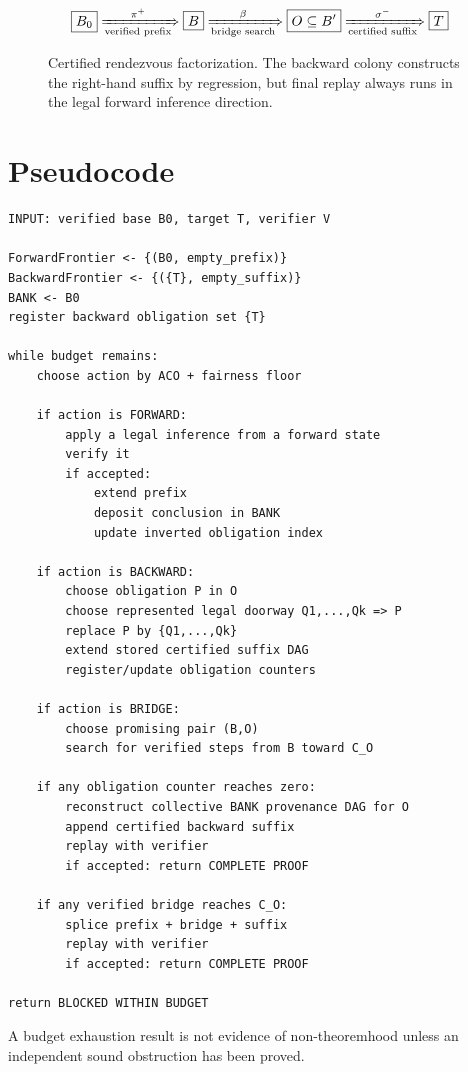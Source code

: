 \documentclass[11pt]{article}
\begin{document}
\begin{figure}[h]
\centering
\[
\boxed{B_0}
\xRightarrow[\text{verified prefix}]{\pi^+}
\boxed{B}
\xRightarrow[\text{bridge search}]{\beta}
\boxed{O\subseteq B'}
\xRightarrow[\text{certified suffix}]{\sigma^-}
\boxed{T}
\]
\caption{Certified rendezvous factorization. The backward colony constructs the right-hand suffix by regression, but final replay always runs in the legal forward inference direction.}
\end{figure}

\section{Pseudocode}

\begin{verbatim}
INPUT: verified base B0, target T, verifier V

ForwardFrontier <- {(B0, empty_prefix)}
BackwardFrontier <- {({T}, empty_suffix)}
BANK <- B0
register backward obligation set {T}

while budget remains:
    choose action by ACO + fairness floor

    if action is FORWARD:
        apply a legal inference from a forward state
        verify it
        if accepted:
            extend prefix
            deposit conclusion in BANK
            update inverted obligation index

    if action is BACKWARD:
        choose obligation P in O
        choose represented legal doorway Q1,...,Qk => P
        replace P by {Q1,...,Qk}
        extend stored certified suffix DAG
        register/update obligation counters

    if action is BRIDGE:
        choose promising pair (B,O)
        search for verified steps from B toward C_O

    if any obligation counter reaches zero:
        reconstruct collective BANK provenance DAG for O
        append certified backward suffix
        replay with verifier
        if accepted: return COMPLETE PROOF

    if any verified bridge reaches C_O:
        splice prefix + bridge + suffix
        replay with verifier
        if accepted: return COMPLETE PROOF

return BLOCKED WITHIN BUDGET
\end{verbatim}

A budget exhaustion result is not evidence of non-theoremhood unless an independent sound obstruction has been proved.
\end{document}
